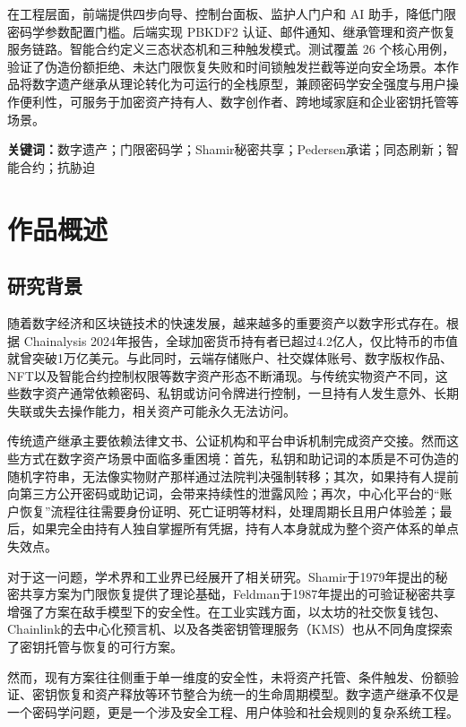 \documentclass[UTF8,a4paper,zihao=-4,openany]{ctexrep}
\begin{document}
在工程层面，前端提供四步向导、控制台面板、监护人门户和 AI 助手，降低门限密码学参数配置门槛。后端实现 PBKDF2 认证、邮件通知、继承管理和资产恢复服务链路。智能合约定义三态状态机和三种触发模式。测试覆盖 26 个核心用例，验证了伪造份额拒绝、未达门限恢复失败和时间锁触发拦截等逆向安全场景。本作品将数字遗产继承从理论转化为可运行的全栈原型，兼顾密码学安全强度与用户操作便利性，可服务于加密资产持有人、数字创作者、跨地域家庭和企业密钥托管等场景。

\textbf{关键词：}数字遗产；门限密码学；Shamir秘密共享；Pedersen承诺；同态刷新；智能合约；抗胁迫

\setcounter{tocdepth}{1}
\tableofcontents

\chapter{作品概述}

\section{研究背景}

随着数字经济和区块链技术的快速发展，越来越多的重要资产以数字形式存在。根据 Chainalysis 2024年报告，全球加密货币持有者已超过4.2亿人，仅比特币的市值就曾突破1万亿美元。与此同时，云端存储账户、社交媒体账号、数字版权作品、NFT以及智能合约控制权限等数字资产形态不断涌现。与传统实物资产不同，这些数字资产通常依赖密码、私钥或访问令牌进行控制，一旦持有人发生意外、长期失联或失去操作能力，相关资产可能永久无法访问。

传统遗产继承主要依赖法律文书、公证机构和平台申诉机制完成资产交接。然而这些方式在数字资产场景中面临多重困境：首先，私钥和助记词的本质是不可伪造的随机字符串，无法像实物财产那样通过法院判决强制转移；其次，如果持有人提前向第三方公开密码或助记词，会带来持续性的泄露风险；再次，中心化平台的“账户恢复”流程往往需要身份证明、死亡证明等材料，处理周期长且用户体验差；最后，如果完全由持有人独自掌握所有凭据，持有人本身就成为整个资产体系的单点失效点。

对于这一问题，学术界和工业界已经展开了相关研究。Shamir于1979年提出的秘密共享方案为门限恢复提供了理论基础，Feldman于1987年提出的可验证秘密共享增强了方案在敌手模型下的安全性。在工业实践方面，以太坊的社交恢复钱包、Chainlink的去中心化预言机、以及各类密钥管理服务（KMS）也从不同角度探索了密钥托管与恢复的可行方案。

然而，现有方案往往侧重于单一维度的安全性，未将资产托管、条件触发、份额验证、密钥恢复和资产释放等环节整合为统一的生命周期模型。数字遗产继承不仅是一个密码学问题，更是一个涉及安全工程、用户体验和社会规则的复杂系统工程。
\end{document}
